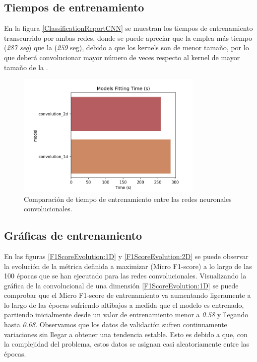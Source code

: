   \subsection{Tiempos de entrenamiento}


    En la figura \eqref{ClassificationReportCNN} se muestran los tiempos de entrenamiento transcurrido por ambas redes, donde se puede apreciar que la  emplea más tiempo (\textit{287 seg}) que la  (\textit{259} seg), debido a que los kernels son de menor tamaño, por lo que deberá convolucionar mayor número de veces respecto al kernel de mayor tamaño de la .

    \begin{figure}[h]
      \centering
      \includegraphics[width=9cm]{archivos/5.Resultados/only_cnns_times}
      \caption{Comparación de tiempo de entrenamiento entre las redes neuronales convolucionales.}
      \label{TiemposEntrenamientoCNNImage}
    \end{figure}



  \subsection{Gráficas de entrenamiento}


    En las figuras \eqref{F1ScoreEvolution:1D} y \eqref{F1ScoreEvolution:2D} se puede observar la evolución de la métrica definida a maximizar (Micro F1-score) a lo largo de las 100 épocas que se han ejecutado para las redes convolucionales. Visualizando la gráfica de la convolucional de una dimensión \eqref{F1ScoreEvolution:1D} se puede comprobar que el Micro F1-score de entrenamiento va aumentando ligeramente a lo largo de las épocas sufriendo altibajos a medida que el modelo es entrenado, partiendo inicialmente desde un valor de entrenamiento menor a \textit{0.58} y llegando hasta \textit{0.68}. Observamos que los datos de validación sufren continuamente variaciones sin llegar a obtener una tendencia estable. Esto es debido a que, con la complejidad del problema, estos datos se asignan casi aleatoriamente entre las épocas.\\


